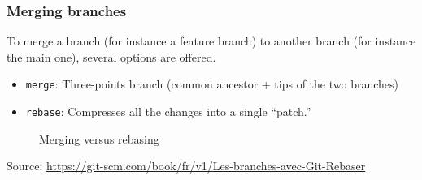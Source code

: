 \documentclass[svgnames]{beamer}
\begin{document}
\begin{frame}[fragile]
    \frametitle{Merging branches}
    To merge a branch (for instance a feature branch) to another branch (for instance the main one), several options are offered.
    \begin{itemize}
        \item{\verb+merge+: Three-points branch (common ancestor + tips of the two branches)} 
        \item{\verb+rebase+: Compresses all the changes into a single “patch.” }
    \end{itemize}

    \begin{center}
        \begin{figure}
            \hspace{3em}
            \caption{Merging versus rebasing}
        \end{figure}
    \end{center}

    \tiny Source: \url{https://git-scm.com/book/fr/v1/Les-branches-avec-Git-Rebaser}

\end{frame}
\end{document}
